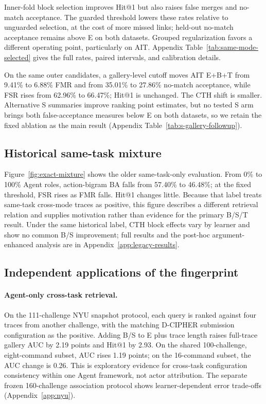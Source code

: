 \documentclass[10pt]{article}
\begin{document}
Inner-fold block selection improves Hit@1 but also raises false merges and no-match acceptance. The guarded threshold lowers these rates relative to unguarded selection, at the cost of more missed links; held-out no-match acceptance remains above E on both datasets. Grouped regularization favors a different operating point, particularly on AIT. Appendix Table~\ref{tab:same-mode-selected} gives the full rates, paired intervals, and calibration details.

On the same outer candidates, a gallery-level cutoff moves AIT E+B+T from 9.41\% to 6.88\% FMR and from 35.01\% to 27.86\% no-match acceptance, while FSR rises from 62.96\% to 66.47\%; Hit@1 is unchanged. The CTH shift is smaller. Alternative S summaries improve ranking point estimates, but no tested S arm brings both false-acceptance measures below E on both datasets, so we retain the fixed ablation as the main result (Appendix Table~\ref{tab:s-gallery-followup}).

\subsection{Historical same-task mixture}
Figure~\ref{fig:exact-mixture} shows the older same-task-only evaluation. From 0\% to 100\% Agent roles, action-bigram BA falls from 57.40\% to 46.48\%; at the fixed threshold, FSR rises as FMR falls. Hit@1 changes little. Because that label treats same-task cross-mode traces as positive, this figure describes a different retrieval relation and supplies motivation rather than evidence for the primary B/S/T result. Under the same historical label, CTH block effects vary by learner and show no common B/S improvement; full results and the post-hoc argument-enhanced analysis are in Appendix~\ref{app:legacy-results}.

\subsection{Independent applications of the fingerprint}
\paragraph{Agent-only cross-task retrieval.}
On the 111-challenge NYU snapshot protocol, each query is ranked against four traces from another challenge, with the matching D-CIPHER submission configuration as the positive. Adding B/S to E plus trace length raises full-trace gallery AUC by 2.19 points and Hit@1 by 2.93. On the shared 100-challenge, eight-command subset, AUC rises 1.19 points; on the 16-command subset, the AUC change is 0.26. This is exploratory evidence for cross-task configuration consistency within one Agent framework, not actor attribution. The separate frozen 160-challenge association protocol shows learner-dependent error trade-offs (Appendix~\ref{app:nyu}).
\end{document}
